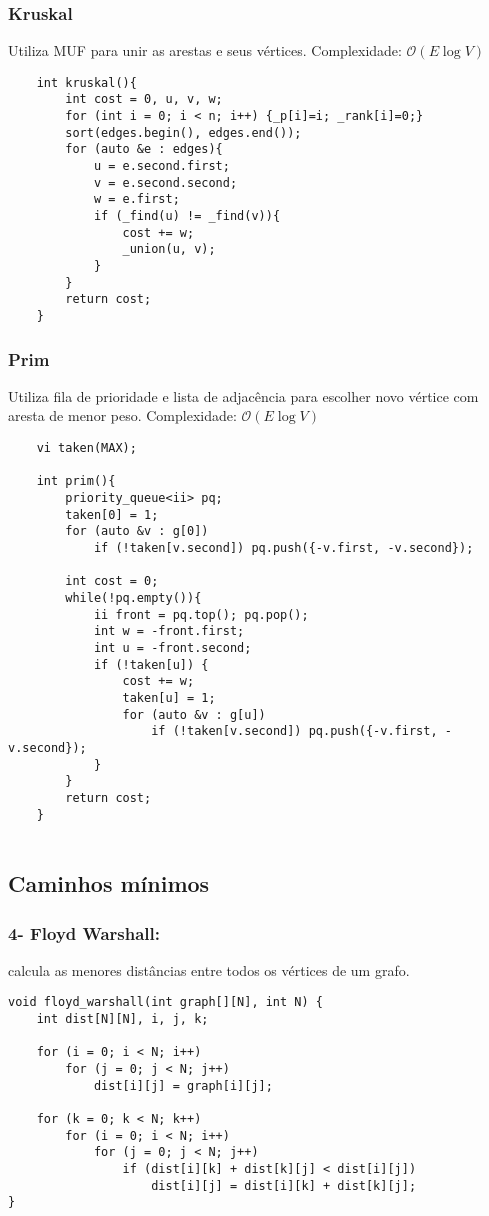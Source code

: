 \subsubsection{Kruskal}
Utiliza MUF para unir as arestas e seus vértices.
Complexidade: $\mathcal{O}(E\log V)$
\begin{verbatim}
    int kruskal(){
        int cost = 0, u, v, w;
        for (int i = 0; i < n; i++) {_p[i]=i; _rank[i]=0;}
        sort(edges.begin(), edges.end());
        for (auto &e : edges){
            u = e.second.first;
            v = e.second.second;
            w = e.first;
            if (_find(u) != _find(v)){
                cost += w;
                _union(u, v);
            }
        }
        return cost;
    }

\end{verbatim}
\subsubsection{Prim}
\par Utiliza fila de prioridade e lista de adjacência para escolher novo vértice com aresta de menor peso.
Complexidade: $\mathcal{O}(E\log V)$

\begin{verbatim}
    vi taken(MAX);

    int prim(){
        priority_queue<ii> pq;
        taken[0] = 1;
        for (auto &v : g[0])
            if (!taken[v.second]) pq.push({-v.first, -v.second});  
    
        int cost = 0;
        while(!pq.empty()){
            ii front = pq.top(); pq.pop();
            int w = -front.first;
            int u = -front.second;
            if (!taken[u]) {
                cost += w;
                taken[u] = 1;
                for (auto &v : g[u])
                    if (!taken[v.second]) pq.push({-v.first, -v.second});  
            }
        }
        return cost;
    }
    
\end{verbatim}
\subsection{Caminhos mínimos}
\subsubsection{4- Floyd Warshall:} calcula as menores distâncias entre todos os vértices de um grafo.
    \begin{verbatim}
void floyd_warshall(int graph[][N], int N) {
    int dist[N][N], i, j, k;

    for (i = 0; i < N; i++)
        for (j = 0; j < N; j++)
            dist[i][j] = graph[i][j];

    for (k = 0; k < N; k++) 
        for (i = 0; i < N; i++) 
            for (j = 0; j < N; j++) 
                if (dist[i][k] + dist[k][j] < dist[i][j])
                    dist[i][j] = dist[i][k] + dist[k][j];
}
    \end{verbatim}
\pagebreak
